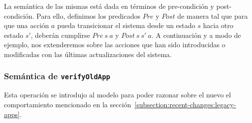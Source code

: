 La semántica de las mismas está dada en términos de pre-condición y post-condición. Para ello,
definimos los predicados $Pre$ y $Post$ de manera tal que para que una acción $a$ pueda transicionar
el sistema desde un estado $s$ hacia otro estado $s'$, deberán cumplirse $Pre\ s\ a$ y $Post\ s\ s'\ a$. A
continuación y a modo de ejemplo, nos extenderemos sobre las acciones que han sido introducidas o
modificadas con las últimas actualizaciones del sistema.

\subsubsection{Semántica de \texttt{verifyOldApp}} Esta operación se introdujo al modelo para poder
razonar sobre el nuevo el comportamiento mencionado en la
sección~\ref{subsection:recent-changes:legacy-apps}.

